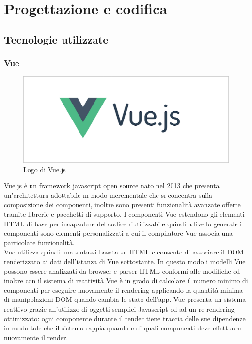 \chapter{Progettazione e codifica}

\section{Tecnologie utilizzate}

\subsection{Vue}
\begin{figure}[H]
	\begin{center}
		\includegraphics[width=0.7\columnwidth]{immagini/vue.png}
		\caption{Logo di Vue.js}
	\end{center}
\end{figure}
Vue.js è un framework javascript open source nato nel 2013 che presenta un'architettura adottabile in modo incrementale che si concentra sulla composizione dei componenti, inoltre sono presenti funzionalità avanzate offerte tramite librerie e pacchetti di supporto. I componenti Vue estendono gli elementi HTML di base per incapsulare del codice riutilizzabile quindi a livello generale i componenti sono elementi personalizzati a cui il compilatore Vue associa una particolare funzionalità.\\
Vue utilizza quindi una sintassi basata su HTML e consente di associare il DOM renderizzato ai dati dell'istanza di Vue sottostante. In questo modo i modelli Vue possono essere analizzati da browser e parser HTML conformi alle modifiche ed inoltre con il sistema di reattività Vue è in grado di calcolare il numero minimo di componenti per eseguire nuovamente il rendering applicando la quantità minima di manipolazioni DOM quando cambia lo stato dell'app. Vue presenta un sistema reattivo grazie all'utilizzo di oggetti semplici Javascript ed ad un re-rendering ottimizzato: ogni componente durante il render tiene traccia delle sue dipendenze in modo tale che il sistema sappia quando e di quali componenti deve effettuare nuovamente il render.\\
